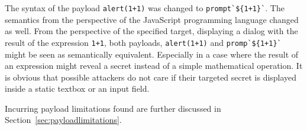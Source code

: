 The syntax of the payload \verb|alert(1+1)| was changed to \verb|prompt`${1+1}`|. The semantics from the perspective of the JavaScript programming language changed as well. From the perspective of the specified target, displaying a dialog with the result of the expression \verb|1+1|, both payloads, \verb|alert(1+1)| and \verb|promp`${1+1}`| might be seen as semantically equivalent. Especially in a case where the result of an expression might reveal a secret instead of a simple mathematical operation. It is obvious that possible attackers do not care if their targeted secret is displayed inside a static textbox or an input field. \cite{js/taggedtemplates,js/alert,js/prompt}

Incurring payload limitations found are further discussed in Section~\ref{sec:payloadlimitations}.
